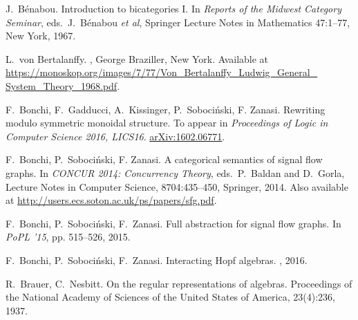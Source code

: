 \begin{thebibliography}{RSW00}
    J.\ B\'enabou.
    \newblock Introduction to bicategories I.
    \newblock In \textsl{Reports
    of the Midwest Category Seminar}, eds.\ J.\ B\'enabou \textit{et al},
    Springer Lecture Notes in Mathematics { 47}:1--77, New York, 1967.


    
    L.\ von Bertalanffy. 
    ,
    George Braziller, New York.
    \newblock Available at
    \href{https://monoskop.org/images/7/77/Von_Bertalanffy_Ludwig_General_System_Theory_1968.pdf}{https://monoskop.org/images/7/77/Von\_Bertalanffy\_Ludwig\_General\_ System\_Theory\_1968.pdf}.

    F.\ Bonchi, F.\ Gadducci, A.\ Kissinger, P.\ Soboci\'nski, F. Zanasi.
    \newblock Rewriting modulo symmetric monoidal structure.
    \newblock To appear in {\sl Proceedings of Logic in Computer Science 2016,
    LICS16}.
    \newblock \href{http://arxiv.org/abs/1602.06771}{arXiv:1602.06771}.

    F.\ Bonchi, P.\ Soboci\'nski, F. Zanasi.
    \newblock A categorical semantics of signal flow graphs.
    \newblock In \emph{CONCUR 2014: Concurrency Theory}, eds.\ P.\ Baldan and
    D.\ Gorla, Lecture Notes in Computer Science, 8704:435--450, Springer, 2014.
    \newblock Also available at
    \href{http://users.ecs.soton.ac.uk/ps/papers/sfg.pdf}
    {http://users.ecs.soton.ac.uk/ps/papers/sfg.pdf}.
    
    F.\ Bonchi, P.\ Soboci\'nski, F.\ Zanasi.
    \newblock Full abstraction for signal flow graphs.
    \newblock In \emph{PoPL '15}, pp. 515--526, 2015.

    F.\ Bonchi, P.\ Soboci\'nski, F.\ Zanasi.
    \newblock Interacting Hopf algebras.
    , 2016.


    R.\ Brauer, C.\ Nesbitt. 
    \newblock On the regular representations of algebras.
    \newblock Proceedings of the National Academy of Sciences of the United
    States of America, 23(4):236, 1937.


\end{thebibliography}

